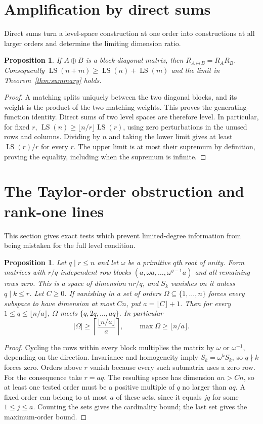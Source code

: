 \documentclass[11pt]{article}
\newcommand{\LS}{\operatorname{LS}}
\newtheorem{proposition}[theorem]{Proposition}
\theoremstyle{definition}
\theoremstyle{remark}
\begin{document}


\section{Amplification by direct sums}
Direct sums turn a level-space construction at one order into constructions at all larger orders and determine the limiting dimension ratio.

\begin{proposition}\label{prop:amplify}
If $A\oplus B$ is a block-diagonal matrix, then $R_{A\oplus B}=R_AR_B$. Consequently $\LS(n+m)\geq\LS(n)+\LS(m)$ and the limit in Theorem~\ref{thm:summary} holds.
\end{proposition}
\begin{proof}
A matching splits uniquely between the two diagonal blocks, and its weight is the product of the two matching weights. This proves the generating-function identity. Direct sums of two level spaces are therefore level. In particular, for fixed $r$, $\LS(n)\geq\lfloor n/r\rfloor\LS(r)$, using zero perturbations in the unused rows and columns. Dividing by $n$ and taking the lower limit gives at least $\LS(r)/r$ for every $r$. The upper limit is at most their supremum by definition, proving the equality, including when the supremum is infinite.
\end{proof}

\section{The Taylor-order obstruction and rank-one lines}
This section gives exact tests which prevent limited-degree information from being mistaken for the full level condition.

\begin{proposition}\label{prop:barrier}
Let $q\mid r\leq n$ and let $\omega$ be a primitive $q$th root of unity. Form matrices with $r/q$ independent row blocks
$(a,\omega a,\ldots,\omega^{q-1}a)$ and all remaining rows zero. This is a space of dimension $nr/q$, and $S_k$ vanishes on it unless $q\mid k\leq r$.
Let $C\ge0$. If vanishing in a set of orders $\Omega\subseteq\{1,\ldots,n\}$ forces every subspace to have dimension at most $Cn$, put $a=\lfloor C\rfloor+1$. Then for every $1\leq q\leq\lfloor n/a\rfloor$, $\Omega$ meets $\{q,2q,\ldots,aq\}$. In particular
\[
 |\Omega|\geq\left\lceil\frac{\lfloor n/a\rfloor}{a}\right\rceil,
 \qquad\max\Omega\geq\lfloor n/a\rfloor.
\]
\end{proposition}
\begin{proof}
Cycling the rows within every block multiplies the matrix by $\omega$ or $\omega^{-1}$, depending on the direction. Invariance and homogeneity imply $S_k=\omega^kS_k$, so $q\nmid k$ forces zero. Orders above $r$ vanish because every such submatrix uses a zero row. For the consequence take $r=aq$. The resulting space has dimension $an>Cn$, so at least one tested order must be a positive multiple of $q$ no larger than $aq$. A fixed order can belong to at most $a$ of these sets, since it equals $jq$ for some $1\leq j\leq a$. Counting the sets gives the cardinality bound; the last set gives the maximum-order bound.
\end{proof}
\end{document}
